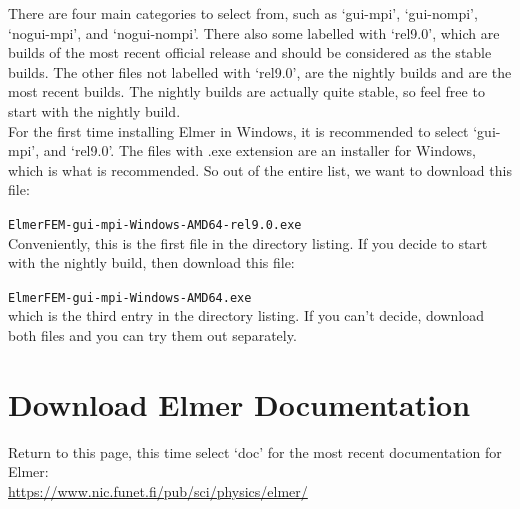 There are four main categories to select from, such as `gui-mpi', `gui-nompi', `nogui-mpi', and `nogui-nompi'.  There also some labelled with `rel9.0', which are builds of the most recent official release and should be considered as the stable builds.  The other files not labelled with `rel9.0', are the nightly builds and are the most recent builds.  The nightly builds are actually quite stable, so feel free to start with the nightly build.\\

For the first time installing Elmer in Windows, it is recommended to select `gui-mpi', and `rel9.0'.  The files with .exe extension are an installer for Windows, which is what is recommended.  So out of the entire list, we want to download this file:

\texttt{ElmerFEM-gui-mpi-Windows-AMD64-rel9.0.exe}\\

Conveniently, this is the first file in the directory listing.  If you decide to start with the nightly build, then download this file:

\texttt{ElmerFEM-gui-mpi-Windows-AMD64.exe}\\

which is the third entry in the directory listing.  If you can't decide, download both files and you can try them out separately.


\section{Download Elmer Documentation}

Return to this page, this time select `doc' for the most recent documentation for Elmer:\\

\url{https://www.nic.funet.fi/pub/sci/physics/elmer/}

